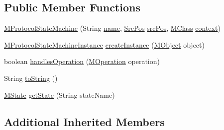 \subsection*{Public Member Functions}
\begin{DoxyCompactItemize}
\item 
\hyperlink{classorg_1_1tzi_1_1use_1_1uml_1_1mm_1_1statemachines_1_1_m_protocol_state_machine_aa9d650e55299a83822eb8802385f4f7c}{M\-Protocol\-State\-Machine} (String \hyperlink{classorg_1_1tzi_1_1use_1_1uml_1_1mm_1_1statemachines_1_1_m_state_machine_a538bcb13ae44862dd544ce80edc5fee5}{name}, \hyperlink{classorg_1_1tzi_1_1use_1_1parser_1_1_src_pos}{Src\-Pos} \hyperlink{classorg_1_1tzi_1_1use_1_1uml_1_1mm_1_1statemachines_1_1_m_state_machine_a4892c5ab13ec73b51355c89b1eeb0cf1}{src\-Pos}, \hyperlink{interfaceorg_1_1tzi_1_1use_1_1uml_1_1mm_1_1_m_class}{M\-Class} \hyperlink{classorg_1_1tzi_1_1use_1_1uml_1_1mm_1_1statemachines_1_1_m_state_machine_abbb45f526adbcec12caa20ac6acb770b}{context})
\item 
\hyperlink{classorg_1_1tzi_1_1use_1_1uml_1_1sys_1_1statemachines_1_1_m_protocol_state_machine_instance}{M\-Protocol\-State\-Machine\-Instance} \hyperlink{classorg_1_1tzi_1_1use_1_1uml_1_1mm_1_1statemachines_1_1_m_protocol_state_machine_a086b45f6ede07cb8a2c6474789280c51}{create\-Instance} (\hyperlink{interfaceorg_1_1tzi_1_1use_1_1uml_1_1sys_1_1_m_object}{M\-Object} object)
\item 
boolean \hyperlink{classorg_1_1tzi_1_1use_1_1uml_1_1mm_1_1statemachines_1_1_m_protocol_state_machine_ac0a6a2d8ced2aaa9d5e1f692e56c121b}{handles\-Operation} (\hyperlink{classorg_1_1tzi_1_1use_1_1uml_1_1mm_1_1_m_operation}{M\-Operation} operation)
\item 
String \hyperlink{classorg_1_1tzi_1_1use_1_1uml_1_1mm_1_1statemachines_1_1_m_protocol_state_machine_a37e84de21caf9f3b4aadbac9579773ad}{to\-String} ()
\item 
\hyperlink{classorg_1_1tzi_1_1use_1_1uml_1_1mm_1_1statemachines_1_1_m_state}{M\-State} \hyperlink{classorg_1_1tzi_1_1use_1_1uml_1_1mm_1_1statemachines_1_1_m_protocol_state_machine_a599b39b505e7951c9b6c0cc1c7b484de}{get\-State} (String state\-Name)
\end{DoxyCompactItemize}
\subsection*{Additional Inherited Members}


